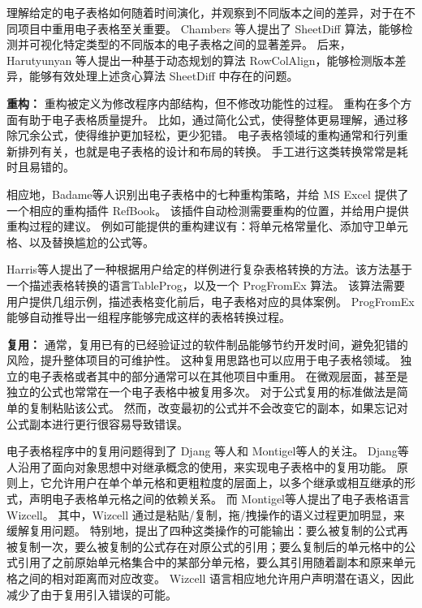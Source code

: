 理解给定的电子表格如何随着时间演化，并观察到不同版本之间的差异，对于在不同项目中重用电子表格至关重要。
Chambers 等人\cite{chambers2010sheetdiff}提出了 SheetDiff 算法，能够检测并可视化特定类型的不同版本的电子表格之间的显著差异。
后来，Harutyunyan 等人\cite{harutyunyan2012planted}提出一种基于动态规划的算法 RowColAlign，能够检测版本差异，能够有效处理上述贪心算法 SheetDiff 中存在的问题。


\textbf{重构：}
重构被定义为修改程序内部结构，但不修改功能性的过程\cite{o2010spreadsheet}。
重构在多个方面有助于电子表格质量提升。
比如，通过简化公式，使得整体更易理解，通过移除冗余公式，使得维护更加轻松，更少犯错。
电子表格领域的重构通常和行列重新排列有关，也就是电子表格的设计和布局的转换。
手工进行这类转换常常是耗时且易错的。

相应地，Badame等人\cite{badame2012refactoring}识别出电子表格中的七种重构策略，并给 MS Excel 提供了一个相应的重构插件 RefBook。
该插件自动检测需要重构的位置，并给用户提供重构过程的建议。
例如可能提供的重构建议有：将单元格常量化、添加守卫单元格、以及替换尴尬的公式等。

Harris等人\cite{harris2011spreadsheet}提出了一种根据用户给定的样例进行复杂表格转换的方法。该方法基于一个描述表格转换的语言TableProg，以及一个 ProgFromEx 算法。 
该算法需要用户提供几组示例，描述表格变化前后，电子表格对应的具体案例。
ProgFromEx 能够自动推导出一组程序能够完成这样的表格转换过程。

\textbf{复用：}
通常，复用已有的已经验证过的软件制品能够节约开发时间，避免犯错的风险，提升整体项目的可维护性\cite{ye2005reuse}。
这种复用思路也可以应用于电子表格领域。
独立的电子表格或者其中的部分通常可以在其他项目中重用。
在微观层面，甚至是独立的公式也常常在一个电子表格中被复用多次。
对于公式复用的标准做法是简单的复制粘贴该公式。
然而，改变最初的公式并不会改变它的副本，如果忘记对公式副本进行更行很容易导致错误。

电子表格程序中的复用问题得到了 Djang 等人\cite{djang1998similarity}和 Montigel等人\cite{montigel2002portability}的关注。
Djang等人\cite{djang1998similarity}沿用了面向对象思想中对继承概念的使用，来实现电子表格中的复用功能。
原则上，它允许用户在单个单元格和更粗粒度的层面上，以多个继承或相互继承的形式，声明电子表格单元格之间的依赖关系。
而 Montigel等人\cite{montigel2002portability}提出了电子表格语言 Wizcell。
其中，Wizcell 通过是粘贴/复制，拖/拽操作的语义过程更加明显，来缓解复用问题。
特别地，提出了四种这类操作的可能输出：要么被复制的公式再被复制一次，要么被复制的公式存在对原公式的引用；要么复制后的单元格中的公式引用了之前原始单元格集合中的某部分单元格，要么其引用随着副本和原来单元格之间的相对距离而对应改变。
Wizcell 语言相应地允许用户声明潜在语义，因此减少了由于复用引入错误的可能。